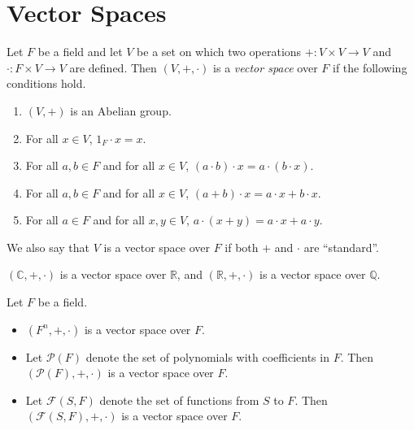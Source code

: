 \section{Vector Spaces}
\begin{definition}\label{def:vector-space}
  Let $F$ be a field and let $V$ be a set on which two operations
  $+: V \times V \to V$ and $\cdot: F \times V \to V$ are defined.
  Then $(V, +, \cdot)$ is a \emph{vector space} over
  $F$ if the following conditions hold.
  \begin{enumerate}[label=(V \arabic*),leftmargin=3.5em]
    \item $(V, +)$ is an Abelian group.
    \item For all $x \in V$, $1_F \cdot x = x$.
    \item For all $a, b \in F$ and for all $x \in V$,
      $(a \cdot b) \cdot x = a \cdot (b \cdot x)$.
    \item For all $a, b \in F$ and for all $x \in V$,
      $(a + b) \cdot x = a \cdot x + b \cdot x$.
    \item For all $a \in F$ and for all $x, y \in V$,
      $a \cdot (x + y) = a \cdot x + a \cdot y$.
  \end{enumerate}
\end{definition}
\begin{remark}
  We also say that $V$ is a vector space over $F$ if both $+$ and $\cdot$
  are ``standard''.
\end{remark}

\begin{example}
  $(\mathbb{C}, +, \cdot)$ is a vector space over $\mathbb{R}$, and
  $(\mathbb{R}, +, \cdot)$ is a vector space over $\mathbb{Q}$.
\end{example}
\begin{example} Let $F$ be a field.
  \begin{itemize}
    \item $(F^n, +, \cdot)$ is a vector space over $F$.
    \item Let $\mathcal{P}(F)$ denote the set of polynomials with coefficients
      in $F$.
      Then $(\mathcal{P}(F), +, \cdot)$ is a vector space over $F$.
    \item Let $\mathcal{F}(S, F)$ denote the set of functions from $S$ to $F$.
      Then $(\mathcal{F}(S, F), +, \cdot)$ is a vector space over $F$.
  \end{itemize}
\end{example}

